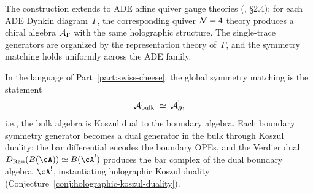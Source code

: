 \begin{remark}
The construction extends to ADE affine quiver gauge theories
\textup{(}\!\cite{CG18}, \S2.4\textup{)}: for each ADE Dynkin
diagram~$\Gamma$, the corresponding quiver $\mathcal N=4$ theory produces a
chiral algebra $\mathcal A_\Gamma$ with the same holographic structure. The
single-trace generators are organized by the representation theory
of~$\Gamma$, and the symmetry matching holds uniformly across the
ADE family.
\end{remark}

\begin{remark}
In the language of Part~\ref{part:swiss-cheese}, the global symmetry matching is the
statement
\begin{equation}%
\A_{\mathrm{bulk}} \;\simeq\; \A_{\partial}^{!},
\end{equation}
i.e., the bulk algebra is Koszul dual to the boundary algebra. Each
boundary symmetry generator becomes a dual generator in the bulk
through Koszul duality: the bar differential encodes the
boundary OPEs, and the Verdier dual $D_{\mathrm{Ran}}(B(\cA))
\simeq B(\cA^!)$ produces the bar complex of the dual
boundary algebra~$\cA^!$, instantiating holographic Koszul duality
\textup{(}Conjecture~\textup{\ref*{conj:holographic-koszul-duality})}.
\end{remark}

